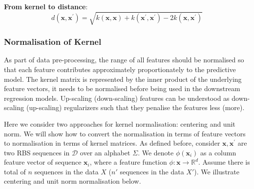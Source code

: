 \textbf{From kernel to distance}:
$$d(\mathbf{x}, \mathbf{x}^\prime) = \sqrt{k(\mathbf{x}, \mathbf{x}) + k(\mathbf{x}^\prime, \mathbf{x}^\prime) - 2 k(\mathbf{x}, \mathbf{x}^\prime)} $$

\subsubsection{Normalisation of Kernel}

As part of data pre-processing,
the range of all features should be normalised so that each feature contributes approximately proportionately to the predictive model. 
The kernel matrix is represented by the inner product of the underlying feature vectors, it needs to be normalised before being used in the downstream regression models. 
Up-scaling (down-scaling) features can be understood as down-scaling (up-scaling) regularizers such that they penalise the features less (more). 

Here we consider two approaches for kernel normalisation: centering and unit norm. 
We will show how to convert the normalisation in terms of feature vectors to normalisation in terms of kernel matrices. 
As defined before, consider $\mathbf{x}, \mathbf{x}^\prime$ are two RBS sequences in $\mathcal{D}$ over an alphabet $\Sigma$.
We denote $\phi(\mathbf{x}_i)$ as a column feature vector of sequence $\mathbf{x}_i$, 
where a feature function $\phi: \mathbf{x} \rightarrow \mathbb{R}^d$. Assume there is total of $n$ sequences in the data $X$ ($n'$ sequences in the data $X'$). 
We illustrate centering and unit norm normalisation below. 

